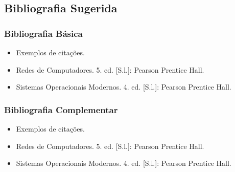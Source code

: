 \subsection[Bibliografia Sugerida]{Bibliografia Sugerida}\label{subsec:plano-ensino-bibliografia}



\begin{frame}[t]\frametitle{Bibliografia Básica}

  \begin{itemize}
    \justifying{}
    \setlength\itemsep{1em}
    \item Exemplos de citações.
    \item Redes de Computadores. 5. ed. [S.l.]: Pearson Prentice Hall. \cite{Tanenbaum2011}
    \item Sistemas Operacionais Modernos. 4. ed. [S.l.]: Pearson Prentice Hall. \cite{Tanenbaum2016}
  \end{itemize}

\end{frame}



\begin{frame}[t]\frametitle{Bibliografia Complementar}

  \begin{itemize}
    \justifying{}
    \setlength\itemsep{1em}
    \item Exemplos de citações.
    \item Redes de Computadores. 5. ed. [S.l.]: Pearson Prentice Hall. \cite{Tanenbaum2011}
    \item Sistemas Operacionais Modernos. 4. ed. [S.l.]: Pearson Prentice Hall. \cite{Tanenbaum2016}
  \end{itemize}

\end{frame}
